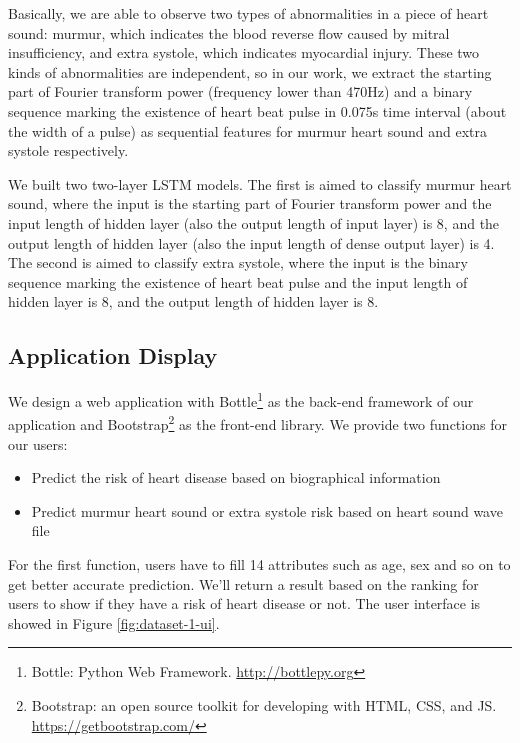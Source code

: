 \documentclass[letterpaper]{article} %
\begin{document}
Basically, we are able to observe two types of abnormalities in a piece of heart sound: murmur, which indicates the blood reverse flow caused by mitral insufficiency, and extra systole, which indicates myocardial injury. These two kinds of abnormalities are independent, so in our work, we extract the starting part of Fourier transform power (frequency lower than 470Hz) and a binary sequence marking the existence of heart beat pulse in 0.075s time interval (about the width of a pulse) as sequential features for murmur heart sound and extra systole respectively. 

We built two two-layer LSTM models. The first is aimed to classify murmur heart sound, where the input is the starting part of Fourier transform power and the input length of hidden layer (also the output length of input layer) is 8, and the output length of hidden layer (also the input length of dense output layer) is 4. The second is aimed to classify extra systole, where the input is the binary sequence marking the existence of heart beat pulse and the input length of hidden layer is 8, and the output length of hidden layer is 8. 

\subsection{Application Display}

We design a web application with Bottle\footnote{Bottle: Python Web Framework. \url{http://bottlepy.org}} as the back-end framework of our application and Bootstrap\footnote{Bootstrap: an open source toolkit for developing with HTML, CSS, and JS. \url{https://getbootstrap.com/}} as the front-end library. We provide two functions for our users:

\begin{itemize}
\item Predict the risk of heart disease based on biographical information
\item Predict murmur heart sound or extra systole risk based on heart sound wave file
\end{itemize}

For the first function, users have to fill 14 attributes such as age, sex and so on to get better accurate prediction. We'll return a result based on the ranking for users to show if they have a risk of heart disease or not. The user interface is showed in Figure \ref{fig:dataset-1-ui}.
\end{document}
